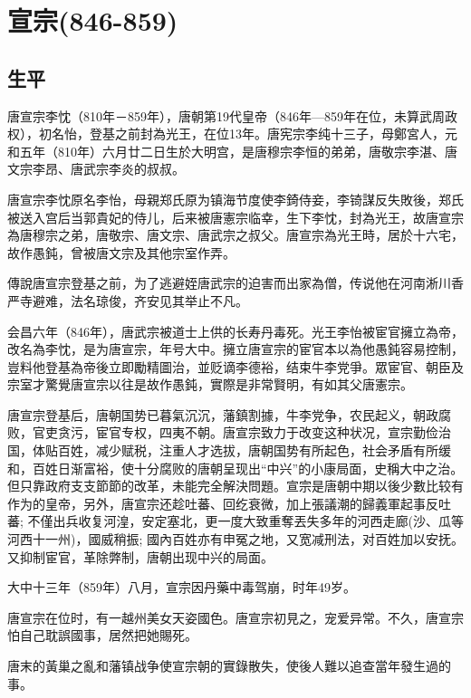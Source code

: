 
\section{宣宗\tiny(846-859)}

\subsection{生平}

唐宣宗李忱（810年－859年），唐朝第19代皇帝（846年—859年在位，未算武周政权），初名怡，登基之前封為光王，在位13年。唐宪宗李纯十三子，母鄭宮人，元和五年（810年）六月廿二日生於大明宫，是唐穆宗李恒的弟弟，唐敬宗李湛、唐文宗李昂、唐武宗李炎的叔叔。

唐宣宗李忱原名李怡，母親郑氏原为镇海节度使李錡侍妾，李锜謀反失敗後，郑氏被送入宫后当郭貴妃的侍儿，后来被唐憲宗临幸，生下李忱，封為光王，故唐宣宗為唐穆宗之弟，唐敬宗、唐文宗、唐武宗之叔父。唐宣宗為光王時，居於十六宅，故作愚鈍，曾被唐文宗及其他宗室作弄。

傳說唐宣宗登基之前，为了逃避姪唐武宗的迫害而出家為僧，传说他在河南淅川香严寺避难，法名琼俊，齐安见其举止不凡。

会昌六年（846年），唐武宗被道士上供的长寿丹毒死。光王李怡被宦官擁立為帝，改名為李忱，是为唐宣宗，年号大中。擁立唐宣宗的宦官本以為他愚鈍容易控制，豈料他登基為帝後立即勵精圖治，並贬谪李德裕，结束牛李党爭。眾宦官、朝臣及宗室才驚覺唐宣宗以往是故作愚鈍，實際是非常賢明，有如其父唐憲宗。

唐宣宗登基后，唐朝国势已暮氣沉沉，藩鎮割據，牛李党争，农民起义，朝政腐败，官吏贪污，宦官专权，四夷不朝。唐宣宗致力于改变这种状况，宣宗勤俭治国，体贴百姓，减少赋税，注重人才选拔，唐朝国势有所起色，社会矛盾有所缓和，百姓日渐富裕，使十分腐败的唐朝呈现出“中兴”的小康局面，史稱大中之治。但只靠政府支支節節的改革，未能完全解決問題。宣宗是唐朝中期以後少數比较有作为的皇帝，另外，唐宣宗还趁吐蕃、回纥衰微，加上張議潮的歸義軍起事反吐蕃; 不僅出兵收复河湟，安定塞北，更一度大致重奪丟失多年的河西走廊(沙、瓜等河西十一州)，國威稍振; 國內百姓亦有申冤之地，又宽减刑法，对百姓加以安抚。又抑制宦官，革除弊制，唐朝出现中兴的局面。

大中十三年（859年）八月，宣宗因丹藥中毒驾崩，时年49岁。

唐宣宗在位时，有一越州美女天姿國色。唐宣宗初見之，宠爱异常。不久，唐宣宗怕自己耽誤國事，居然把她賜死。

唐末的黃巢之亂和藩镇战争使宣宗朝的實錄散失，使後人難以追查當年發生過的事。

